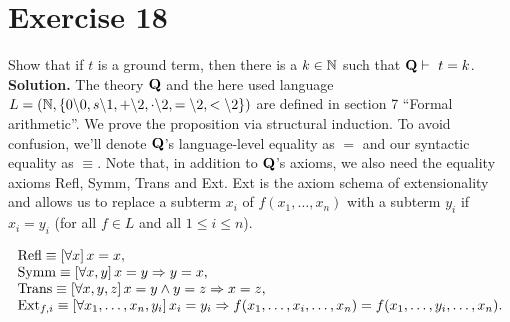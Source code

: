 \section{Exercise 18}

Show that if $t$ is a ground term, then there is a $k \in \mathbb{N}$ such that $\mathbf{Q} \vdash\ t = k$.\\

\noindent
\textbf{Solution.} The theory $\mathbf{Q}$ and the here used language $L = (\mathbb{N}, \{0\backslash0, s\backslash1, +\backslash2, \cdot\backslash2, =\backslash2, <\backslash2\})$ are defined in section 7 ``Formal arithmetic''. We prove the proposition via structural induction.
To avoid confusion, we'll denote $\mathbf{Q}$'s language-level equality as $=$ and our syntactic equality as $\equiv$.
Note that, in addition to $\mathbf{Q}$'s axioms, we also need the equality axioms Refl, Symm, Trans and Ext. Ext is the axiom schema of extensionality and allows us to replace a subterm $x_i$ of $f(x_1,\dots,x_n)$ with a subterm $y_i$ if $x_i = y_i$ (for all $f \in L$ and all $1 \leq i \leq n$).

$$
	\begin{array}{l}
		\textnormal{Refl} \equiv \left[ \forall x \right] x = x,\\
		\textnormal{Symm} \equiv \left[ \forall x,y \right] x = y \Rightarrow y = x,\\
		\textnormal{Trans} \equiv \left[ \forall x,y,z \right] x = y \wedge y = z \Rightarrow x = z,\\
		\textnormal{Ext}_{f,i} \equiv \left[ \forall x_1,\dots,x_n,y_i \right] x_i = y_i \Rightarrow f(x_1,\dots,x_i,\dots,x_n) = f(x_1,\dots,y_i,\dots,x_n).
	\end{array}
$$

